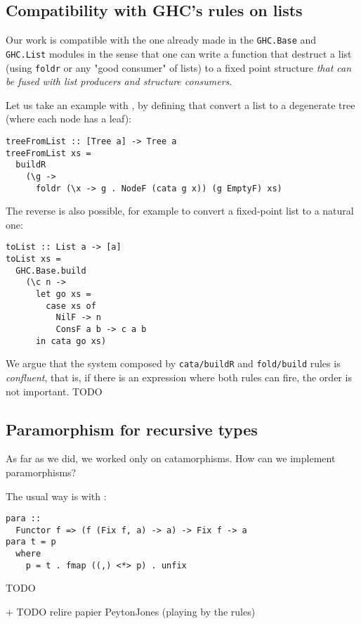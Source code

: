 \subsection{Compatibility with GHC's rules on lists}
Our work is compatible with the one already made in the \verb|GHC.Base| and \verb|GHC.List| modules in the sense that one can write a function that destruct a list (using \verb|foldr| or any "good consumer" of lists) to a fixed point structure \emph{that can be fused with list producers and structure consumers}.

Let us take an example with , by defining  that convert a list to a degenerate tree (where each node has a leaf):
\begin{verbatim}
treeFromList :: [Tree a] -> Tree a
treeFromList xs =
  buildR
    (\g ->
      foldr (\x -> g . NodeF (cata g x)) (g EmptyF) xs)
\end{verbatim}

The reverse is also possible, for example to convert a fixed-point list to a natural one:
\begin{verbatim}
toList :: List a -> [a]
toList xs =
  GHC.Base.build
    (\c n ->
      let go xs =
        case xs of
          NilF -> n
          ConsF a b -> c a b
      in cata go xs)
\end{verbatim}

We argue that the system composed by \verb|cata/buildR| and \verb|fold/build| rules is \emph{confluent}, that is, if there is an expression where both rules can fire, the order is not important. TODO
\subsection{Paramorphism for recursive types}
\label{sec:para-rec}
As far as we did, we worked only on catamorphisms. How can we implement paramorphisms?

The usual way is with :
\begin{verbatim}
para ::
  Functor f => (f (Fix f, a) -> a) -> Fix f -> a
para t = p
  where
    p = t . fmap ((,) <*> p) . unfix
\end{verbatim}

TODO


+ TODO relire papier PeytonJones (playing by the rules)